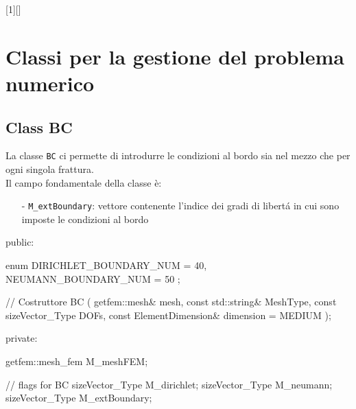 [1][]{}{}

\chapter{Classi per la gestione del problema numerico}
\section{Class BC}
La classe \texttt{BC} ci permette di introdurre le condizioni al bordo sia nel mezzo che per ogni singola frattura. \\ 
Il campo fondamentale della classe \`{e}:
	\begin{enumerate}
	\item[-] \texttt{M\_extBoundary}: vettore contenente l'indice dei gradi di libert\'{a} in cui sono imposte le condizioni al bordo
	\end{enumerate} 

\begin{Code03_03}[caption={Classe \texttt{BC}}]
public:

    enum
    {
        DIRICHLET_BOUNDARY_NUM = 40,
        NEUMANN_BOUNDARY_NUM = 50
    };

    // Costruttore
    BC ( getfem::mesh& mesh,
         const std::string& MeshType,
         const sizeVector_Type DOFs,
         const ElementDimension& dimension = MEDIUM );

private:

    getfem::mesh_fem M_meshFEM;
    
    // flags for BC
    sizeVector_Type M_dirichlet;
    sizeVector_Type M_neumann;
    sizeVector_Type M_extBoundary;
\end{Code03_03}

